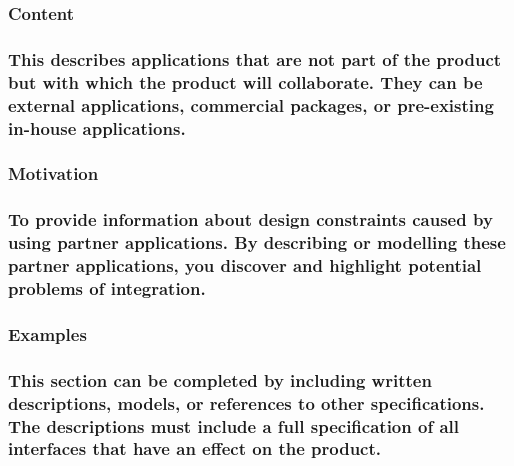 \documentclass[
]{article}
\begin{document}
\hypertarget{content-12}{%
\subsubsection{Content}\label{content-12}}

\hypertarget{this-describes-applications-that-are-not-part-of-the-product-but-with-which-the-product-will-collaborate.-they-can-be-external-applications-commercial-packages-or-pre-existing-in-house-applications.}{%
\subsubsection{This describes applications that are not part of the
product but with which the product will collaborate. They can be
external applications, commercial packages, or pre-existing in-house
applications.}\label{this-describes-applications-that-are-not-part-of-the-product-but-with-which-the-product-will-collaborate.-they-can-be-external-applications-commercial-packages-or-pre-existing-in-house-applications.}}

\hypertarget{motivation-12}{%
\subsubsection{Motivation}\label{motivation-12}}

\hypertarget{to-provide-information-about-design-constraints-caused-by-using-partner-applications.-by-describing-or-modelling-these-partner-applications-you-discover-and-highlight-potential-problems-of-integration.}{%
\subsubsection{To provide information about design constraints caused by
using partner applications. By describing or modelling these partner
applications, you discover and highlight potential problems of
integration.}\label{to-provide-information-about-design-constraints-caused-by-using-partner-applications.-by-describing-or-modelling-these-partner-applications-you-discover-and-highlight-potential-problems-of-integration.}}

\hypertarget{examples-4}{%
\subsubsection{Examples}\label{examples-4}}

\hypertarget{this-section-can-be-completed-by-including-written-descriptions-models-or-references-to-other-specifications.-the-descriptions-must-include-a-full-specification-of-all-interfaces-that-have-an-effect-on-the-product.}{%
\subsubsection{This section can be completed by including written
descriptions, models, or references to other specifications. The
descriptions must include a full specification of all interfaces that
have an effect on the
product.}\label{this-section-can-be-completed-by-including-written-descriptions-models-or-references-to-other-specifications.-the-descriptions-must-include-a-full-specification-of-all-interfaces-that-have-an-effect-on-the-product.}}
\end{document}
